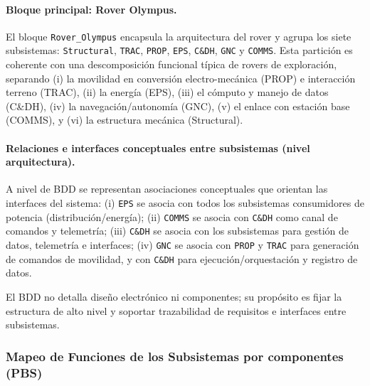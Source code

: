 \paragraph{Bloque principal: Rover Olympus.}
El bloque \texttt{Rover\_Olympus} encapsula la arquitectura del rover y agrupa los siete subsistemas: \texttt{Structural}, \texttt{TRAC}, \texttt{PROP}, \texttt{EPS}, \texttt{C\&DH}, \texttt{GNC} y \texttt{COMMS}. Esta partición es coherente con una descomposición funcional típica de rovers de exploración, separando (i) la movilidad en conversión electro-mecánica (PROP) e interacción terreno (TRAC), (ii) la energía (EPS), (iii) el cómputo y manejo de datos (C\&DH), (iv) la navegación/autonomía (GNC), (v) el enlace con estación base (COMMS), y (vi) la estructura mecánica (Structural).

\paragraph{Relaciones e interfaces conceptuales entre subsistemas (nivel arquitectura).}
A nivel de BDD se representan asociaciones conceptuales que orientan las interfaces del sistema:
(i) \texttt{EPS} se asocia con todos los subsistemas consumidores de potencia (distribución/energía);
(ii) \texttt{COMMS} se asocia con \texttt{C\&DH} como canal de comandos y telemetría;
(iii) \texttt{C\&DH} se asocia con los subsistemas para gestión de datos, telemetría e interfaces;
(iv) \texttt{GNC} se asocia con \texttt{PROP} y \texttt{TRAC} para generación de comandos de movilidad, y con \texttt{C\&DH} para ejecución/orquestación y registro de datos.

El BDD no detalla diseño electrónico ni componentes; su propósito es fijar la estructura de alto nivel y soportar trazabilidad de requisitos e interfaces entre subsistemas.


\subsubsection{Mapeo de Funciones de los Subsistemas por componentes (PBS)}

